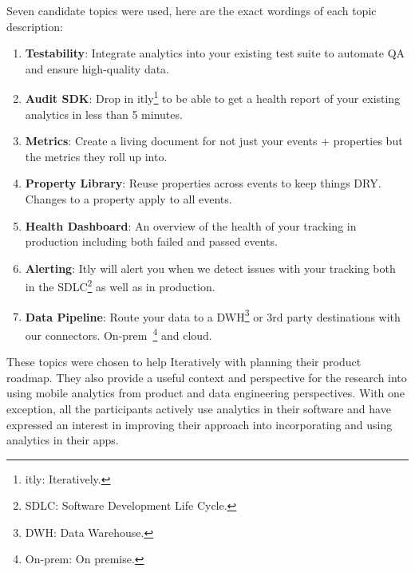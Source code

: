 Seven candidate topics were used, here are the exact wordings of each topic description:
\begin{enumerate}
    \item \textbf{Testability}: Integrate analytics into your existing test suite to automate QA and ensure high-quality data.
    \item \textbf{Audit SDK}: Drop in itly\footnote{itly: Iteratively.} to be able to get a health report of your existing analytics in less than 5 minutes.
    \item \textbf{Metrics}: Create a living document for not just your events + properties but the metrics they roll up into.
    \item \textbf{Property Library}: Reuse properties across events to keep things DRY. Changes to a property apply to all events.
    \item \textbf{Health Dashboard}: An overview of the health of your tracking in production including both failed and passed events.
    \item \textbf{Alerting}: Itly will alert you when we detect issues with your tracking both in the SDLC\footnote{SDLC: Software Development Life Cycle.} as well as in production.
    \item \textbf{Data Pipeline}: Route your data to a DWH\footnote{DWH: Data Warehouse.} or 3rd party destinations with our connectors. On-prem~\footnote{On-prem: On premise.} and cloud.
\end{enumerate}
These topics were chosen to help Iteratively with planning their product roadmap. They also provide a useful context and perspective for the research into using mobile analytics from product and data engineering perspectives. With one exception, all the participants actively use analytics in their software and have expressed an interest in improving their approach into incorporating and using analytics in their apps.

